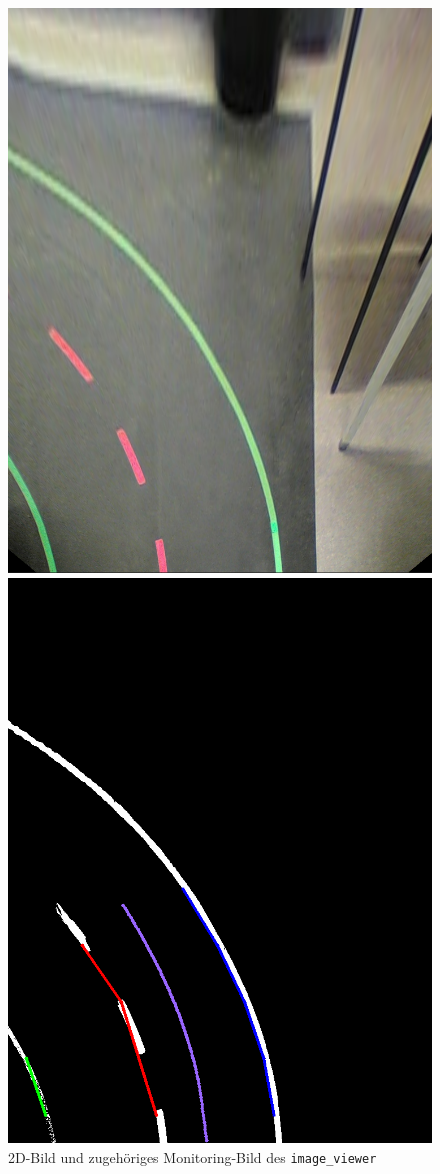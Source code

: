 \begin{figure}[!htb]
	\centering
	\begin{minipage}{.5\textwidth}
		\centering
		\includegraphics[width=0.7\linewidth]{images/transformed_color}
	\end{minipage}%
	\begin{minipage}{0.5\textwidth}
		\centering
		\includegraphics[width=0.7\linewidth]{images/trajectory}
	\end{minipage}
\label{fig:monitoring}
\caption{2D-Bild und zugeh\"origes Monitoring-Bild des \texttt{image\_viewer}}
\end{figure}

